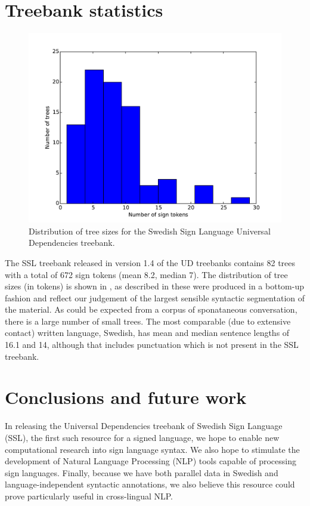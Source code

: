\documentclass[11pt]{article}
\begin{document}
\section{Treebank statistics}

\begin{figure}[tb]
	\centering
	\includegraphics[width=\linewidth]{treesizes.pdf}
    \caption{Distribution of tree sizes for the Swedish Sign
        Language Universal Dependencies treebank.}
	\label{fig:treesizes}
\end{figure}

The SSL treebank released in version 1.4 of the UD treebanks
contains 82 trees with a total of 672 sign tokens (mean 8.2, median 7).
The distribution of tree sizes (in tokens) is shown in ,
as described in  these were produced in a bottom-up
fashion and reflect our judgement of the largest sensible syntactic
segmentation of the material.
As could be expected from a corpus of sponataneous conversation, there is a
large number of small trees. The most comparable (due to extensive contact)
written language, Swedish, has mean and median sentence lengths of 16.1 and
14, although that includes punctuation which is not present in the SSL
treebank.


\section{Conclusions and future work}

In releasing the Universal Dependencies treebank of Swedish Sign Language
(SSL), the first such resource for a signed language,
we hope to enable new computational research into sign language syntax.
We also hope to stimulate the development of Natural
Language Processing (NLP) tools capable of processing sign languages.
Finally, because we have both parallel data in Swedish and language-independent
syntactic annotations, we also believe this resource could prove particularly
useful in cross-lingual NLP.


%



\end{document}
